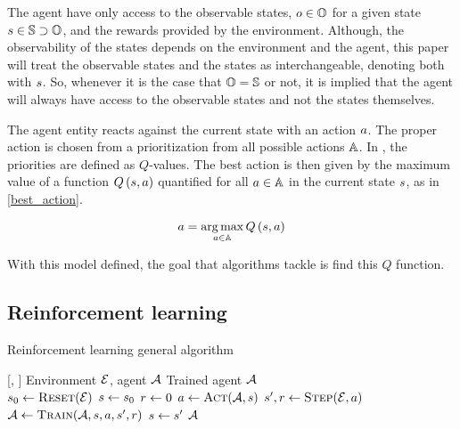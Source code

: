 \documentclass[conference]{IEEEtran}
\begin{document}
The agent have only access to the observable states, $o \in \mathbb{O}$ for a given state $s \in \mathbb{S} \supset \mathbb{O}$, and the rewards provided by the environment.
Although, the observability of the states depends on the environment and the agent, this paper will treat the observable states and the states as interchangeable, denoting both with $s$.
So, whenever it is the case that $\mathbb{O} = \mathbb{S}$ or not, it is implied that the agent will always have access to the observable states and not the states themselves.

The agent entity reacts against the current state with an action $a$.
The proper action is chosen from a prioritization from all possible actions $\mathbb{A}$.
In {\Qlearning}, the priorities are defined as $Q$-values.
The best action is then given by the maximum value of a function $\Qf$ quantified for all $a \in \mathbb{A}$ in the current state $s$, as in \ref{best_action}.

\begin{equation}
    \action = \argmax_{\action \in \actions}{\Qf}
    \label{best_action}
\end{equation}

With this model defined, the goal that {\Qlearning} algorithms tackle is find this $Q$ function.

\subsection{Reinforcement learning}\label{reinforcement learning}

\begin{algorithm}[bp]
    \caption{Reinforcement learning general algorithm}
    \begin{algorithmic}[1]
        [\environment, \agent]
        \INPUT Environment $\mathcal{E}$, agent $\mathcal{A}$
        \OUTPUT  Trained agent $\mathcal{A}$
        \\
            \STATE $ s_0  \gets \textsc{Reset}(\mathcal{E}) $
            \STATE $ s  \gets s_0 $
            \STATE $ r \gets 0 $
                \STATE $ a \gets \textsc{Act}(\mathcal{A}, s) $
                \STATE $ s^{\prime}, r \gets \textsc{Step}(\mathcal{E}, a) $
                \STATE $ \mathcal{A} \gets \textsc{Train}(\mathcal{A}, s, a, s^{\prime}, r) $
                \STATE $ s \gets s^{\prime} $
            \ENDWHILE
        \ENDFOR
        \RETURN $\mathcal{A}$
    \end{algorithmic}
    \label{reinforcement learning algorithm}
\end{algorithm}
\end{document}
